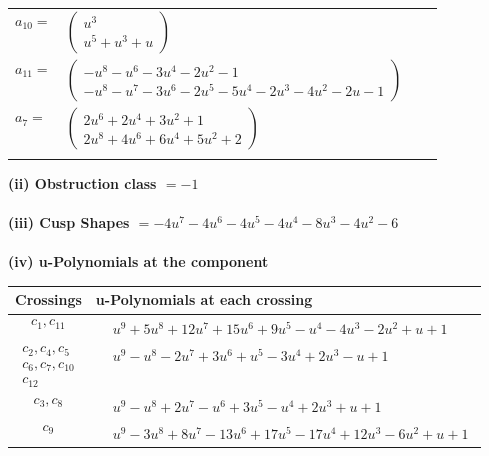 \documentclass[1p]{elsarticle_modified}
\theoremstyle{definition}
\begin{document}
\begin{tabular}{m{7pt} m{180pt} m{7pt} m{180pt} }
\flushright $a_{10}=$&$\begin{pmatrix}u^3\\u^5+u^3+u\end{pmatrix}$ \\
\flushright $a_{11}=$&$\begin{pmatrix}- u^8- u^6-3 u^4-2 u^2-1\\- u^8- u^7-3 u^6-2 u^5-5 u^4-2 u^3-4 u^2-2 u-1\end{pmatrix}$ \\
\flushright $a_{7}=$&$\begin{pmatrix}2 u^6+2 u^4+3 u^2+1\\2 u^8+4 u^6+6 u^4+5 u^2+2\end{pmatrix}$\\&\end{tabular}
\flushleft \textbf{(ii) Obstruction class $= -1$}\\~\\
\flushleft \textbf{(iii) Cusp Shapes $= -4 u^7-4 u^6-4 u^5-4 u^4-8 u^3-4 u^2-6$}\\~\\
\newpage\renewcommand{\arraystretch}{1}
\flushleft \textbf{(iv) u-Polynomials at the component}\newline \\
\begin{tabular}{m{50pt}|m{274pt}}
Crossings & \hspace{64pt}u-Polynomials at each crossing \\
\hline $$\begin{aligned}c_{1},c_{11}\end{aligned}$$&$\begin{aligned}
&u^9+5 u^8+12 u^7+15 u^6+9 u^5- u^4-4 u^3-2 u^2+u+1
\end{aligned}$\\
\hline $$\begin{aligned}c_{2},c_{4},c_{5}\\c_{6},c_{7},c_{10}\\c_{12}\end{aligned}$$&$\begin{aligned}
&u^9- u^8-2 u^7+3 u^6+u^5-3 u^4+2 u^3- u+1
\end{aligned}$\\
\hline $$\begin{aligned}c_{3},c_{8}\end{aligned}$$&$\begin{aligned}
&u^9- u^8+2 u^7- u^6+3 u^5- u^4+2 u^3+u+1
\end{aligned}$\\
\hline $$\begin{aligned}c_{9}\end{aligned}$$&$\begin{aligned}
&u^9-3 u^8+8 u^7-13 u^6+17 u^5-17 u^4+12 u^3-6 u^2+u+1
\end{aligned}$\\
\hline
\end{tabular}\\~\\
\end{document}
